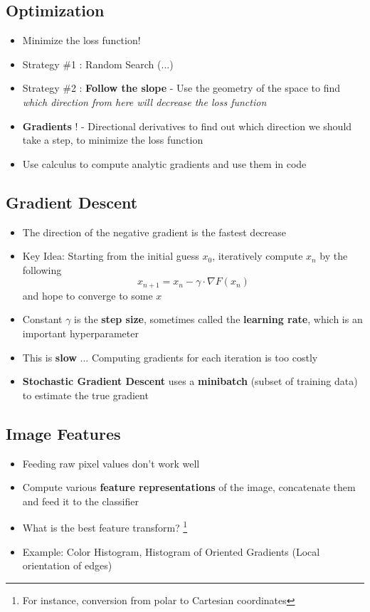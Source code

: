 \subsection{Optimization}
\begin{itemize}
	\item Minimize the loss function!
	\item Strategy \#1 : Random Search (...)
	\item Strategy \#2 : \textbf{Follow the slope} - Use the geometry of the space to find \textit{which direction from here will decrease the loss function}
	\item \textbf{Gradients} ! - Directional derivatives to find out which direction we should take a step, to minimize the loss function
	\item Use calculus to compute analytic gradients and use them in code
\end{itemize}

\subsection{Gradient Descent}
\begin{itemize}
	\item The direction of the negative gradient is the fastest decrease
	\item Key Idea: Starting from the initial guess $x_0$, iteratively compute $x_n$ by the following
	$$x_{n+1} = x_n - \gamma \cdot \nabla F(x_n)$$
	and hope to converge to some $x$
	\item Constant $\gamma$ is the \textbf{step size}, sometimes called the \textbf{learning rate}, which is an important hyperparameter
	\item This is \textbf{slow} ... Computing gradients for each iteration is too costly
	\item \textbf{Stochastic Gradient Descent} uses a \textbf{minibatch} (subset of training data) to estimate the true gradient
\end{itemize}

\subsection{Image Features}
\begin{itemize}
	\item Feeding raw pixel values don't work well
	\item Compute various \textbf{feature representations} of the image, concatenate them and feed it to the classifier
	\item What is the best feature transform? \footnote{For instance, conversion from polar to Cartesian coordinates}
	\item Example: Color Histogram, Histogram of Oriented Gradients (Local orientation of edges)
\end{itemize}

